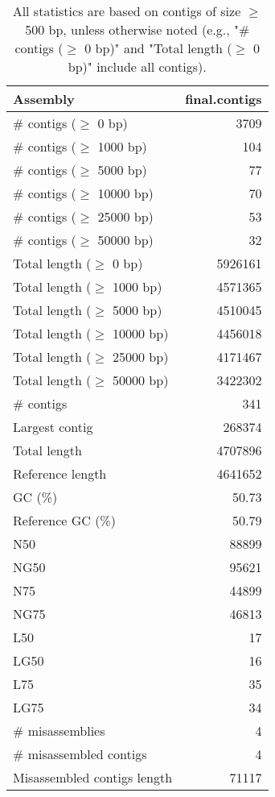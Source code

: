 \documentclass[12pt,a4paper]{article}
\begin{document}
\begin{table}[ht]
\begin{center}
\caption{All statistics are based on contigs of size $\geq$ 500 bp, unless otherwise noted (e.g., "\# contigs ($\geq$ 0 bp)" and "Total length ($\geq$ 0 bp)" include all contigs).}
\begin{tabular}{|l*{1}{|r}|}
\hline
Assembly & final.contigs \\ \hline
\# contigs ($\geq$ 0 bp) & 3709 \\ \hline
\# contigs ($\geq$ 1000 bp) & 104 \\ \hline
\# contigs ($\geq$ 5000 bp) & 77 \\ \hline
\# contigs ($\geq$ 10000 bp) & 70 \\ \hline
\# contigs ($\geq$ 25000 bp) & 53 \\ \hline
\# contigs ($\geq$ 50000 bp) & 32 \\ \hline
Total length ($\geq$ 0 bp) & 5926161 \\ \hline
Total length ($\geq$ 1000 bp) & 4571365 \\ \hline
Total length ($\geq$ 5000 bp) & 4510045 \\ \hline
Total length ($\geq$ 10000 bp) & 4456018 \\ \hline
Total length ($\geq$ 25000 bp) & 4171467 \\ \hline
Total length ($\geq$ 50000 bp) & 3422302 \\ \hline
\# contigs & 341 \\ \hline
Largest contig & 268374 \\ \hline
Total length & 4707896 \\ \hline
Reference length & 4641652 \\ \hline
GC (\%) & 50.73 \\ \hline
Reference GC (\%) & 50.79 \\ \hline
N50 & 88899 \\ \hline
NG50 & 95621 \\ \hline
N75 & 44899 \\ \hline
NG75 & 46813 \\ \hline
L50 & 17 \\ \hline
LG50 & 16 \\ \hline
L75 & 35 \\ \hline
LG75 & 34 \\ \hline
\# misassemblies & 4 \\ \hline
\# misassembled contigs & 4 \\ \hline
Misassembled contigs length & 71117 \\ \hline

\end{tabular}
\end{center}
\end{table}
\end{document}
